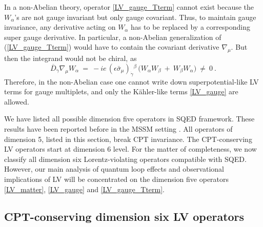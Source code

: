 \documentclass[12pt]{revtex4}
\begin{document}
In a non-Abelian theory, operator \eqref{LV_gauge_Tterm} cannot exist
because the $W_\alpha$'s are not gauge invariant but only gauge covariant.
Thus, to maintain gauge invariance, any derivative acting on 
$ W_\alpha $ has to
be replaced by a corresponding super gauge derivative. 
In particular, a non-Abelian generalization of 
 (\ref{LV_gauge_Tterm}) would have to contain the covariant
derivative $\nabla_\mu$.  
But then the integrand would not be chiral, as 
%
\begin{equation}
\overline{D}_{\dot\gamma} \nabla_\mu W_\alpha ~=~ 
-i e\, (\epsilon \bar\sigma_\mu)_{\dot\gamma}{}^\beta\, 
\Big( W_\alpha W_\beta ~+~ W_\beta W_\alpha \Big) ~\neq~ 0~. 
\end{equation} 
%
Therefore, in the non-Abelian case one cannot write down
superpotential-like LV terms for gauge multiplets, and only 
the K\"ahler-like terms \eqref{LV_gauge} are allowed. 

We have listed all possible dimension five operators in SQED
framework. These results have been reported before in the MSSM setting
\cite{GrootNibbelink:2004za}. 
All operators of dimension 5, listed in this section, break CPT invariance. 
The CPT-conserving LV operators start at dimension 6 level. 
For the matter of completeness, we now classify all dimension 
six Lorentz-violating operators compatible with SQED. 
However, our main analysis of quantum loop effects and observational 
implications of LV will be concentrated on the dimension five
operators \eqref{LV_matter}, \eqref{LV_gauge} and \eqref{LV_gauge_Tterm}.


\subsection{CPT-conserving dimension six LV operators}
\label{Dim6}
\end{document}
